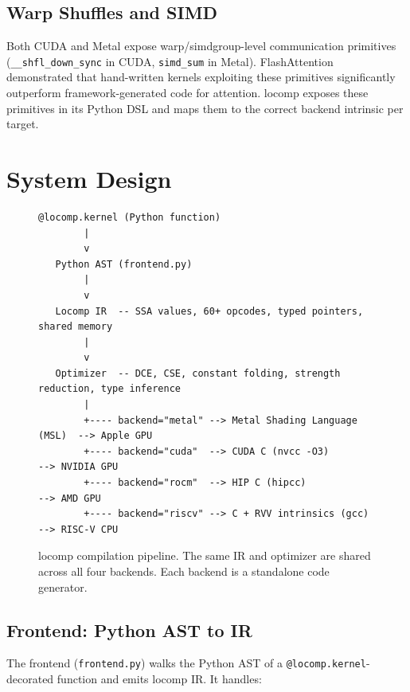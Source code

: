 \documentclass[10pt,twocolumn]{article}
\begin{document}
\subsection{Warp Shuffles and SIMD}

Both CUDA and Metal expose warp/simdgroup-level communication primitives
(\texttt{\_\_shfl\_down\_sync} in CUDA, \texttt{simd\_sum} in Metal).
FlashAttention~\cite{flash} demonstrated that hand-written kernels exploiting
these primitives significantly outperform framework-generated code for
attention. locomp exposes these primitives in its Python DSL and maps them to
the correct backend intrinsic per target.

\section{System Design}
\label{sec:design}

\begin{figure}[t]
\centering
\begin{verbatim}
@locomp.kernel (Python function)
        |
        v
   Python AST (frontend.py)
        |
        v
   Locomp IR  -- SSA values, 60+ opcodes, typed pointers, shared memory
        |
        v
   Optimizer  -- DCE, CSE, constant folding, strength reduction, type inference
        |
        +---- backend="metal" --> Metal Shading Language (MSL)  --> Apple GPU
        +---- backend="cuda"  --> CUDA C (nvcc -O3)             --> NVIDIA GPU
        +---- backend="rocm"  --> HIP C (hipcc)                 --> AMD GPU
        +---- backend="riscv" --> C + RVV intrinsics (gcc)      --> RISC-V CPU
\end{verbatim}
\caption{locomp compilation pipeline. The same IR and optimizer are shared
across all four backends. Each backend is a standalone code generator.}
\label{fig:pipeline}
\end{figure}

\subsection{Frontend: Python AST to IR}

The frontend (\texttt{frontend.py}) walks the Python AST of a
\texttt{@locomp.kernel}-decorated function and emits locomp IR. It handles:
\end{document}
